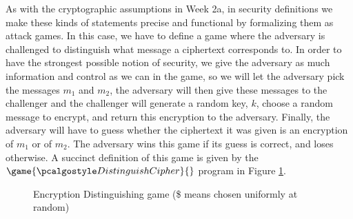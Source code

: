 \documentclass[12pt]{article}
\theoremstyle{definition}
\theoremstyle{remark}
\theoremstyle{definition}
\begin{document}
As with the cryptographic assumptions in Week 2a, in security definitions we make these kinds of statements precise and functional by formalizing them as attack games. In this case, we have to define a game where the adversary is challenged to distinguish what message a ciphertext corresponds to. In order to have the strongest possible notion of security, we give the adversary as much information and control as we can in the game, so we will let the adversary pick the messages $m_1$ and $m_2$, the adversary will then give these messages to the challenger and the challenger will generate a random key, $k$, choose a random message to encrypt, and return this encryption to the adversary. Finally, the adversary will have to guess whether the ciphertext it was given is an encryption of $m_1$ or of $m_2$. The adversary wins this game if its guess is correct, and loses otherwise. A succinct definition of this game is given by the $\game{\algo{DistinguishCipher}}{}$ program in Figure \ref{fig:semantic_secure}.

\begin{figure}[tbhp]
  \begin{minipage}[t]{0.5\textwidth}\begin{flushright}
    \begin{tcolorbox}[width=5cm]
      \begin{pchstack}[center]
      \end{pchstack}
    \end{tcolorbox}\end{flushright}\end{minipage}\begin{minipage}[t]{0.5\textwidth}
    \begin{tcolorbox}[width=5cm]
      \begin{pchstack}[center]
      \end{pchstack}
    \end{tcolorbox}
  \end{minipage}
  \caption{Encryption Distinguishing game (\$ means chosen uniformly at random)\label{fig:semantic_secure}}
\end{figure}
\end{document}
